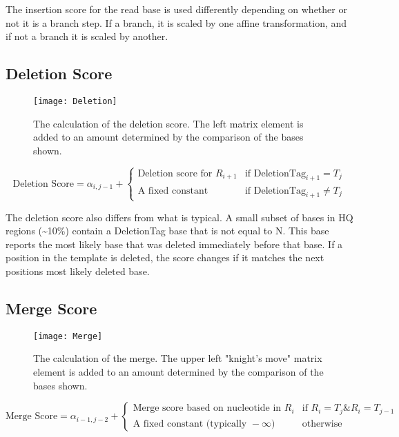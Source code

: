 \documentclass[paper=a4, fontsize=11pt]{scrartcl}
\numberwithin{equation}{section}		%
\numberwithin{figure}{section}			%
\numberwithin{table}{section}				%
\begin{document}
The insertion score for the read base is used differently depending on whether or not it is a branch step.  If a branch, it is scaled by one affine transformation, and if not a branch it is scaled by another.




\subsection{\textbf{Deletion Score}}

\begin{figure}[H] %
	\texttt{[image: Deletion]}
		\caption{The calculation of the deletion score.  The left matrix element is added to an amount determined by the comparison of the bases shown.}				
\end{figure}

\[
	\text{Deletion Score} = \alpha_{i,j-1}  +  \begin{cases}
							 \text{Deletion score  for } R_{i+1}  & \text{if }  \text{DeletionTag}_{i+1} = T_{j} \\
							 \text{A fixed constant} & \text{if }  \text{DeletionTag}_{i+1} \neq T_{j} 
							 \end{cases}
\]

The deletion score also differs from what is typical.  A small subset of bases in HQ regions (\textasciitilde10\%) contain a DeletionTag base that is not equal to N.  This base reports the most likely base that was deleted immediately before that base.  If a position in the template is deleted, the score changes if it matches the next positions most likely deleted base.




\subsection{\textbf{Merge Score}}
\begin{figure}[H] %
	\texttt{[image: Merge]}
		\caption{The calculation of the merge.  The upper left "knight's move" matrix element is added to an amount determined by the comparison of the bases shown.}				
\end{figure}

\[
	\text{Merge Score} = \alpha_{i-1,j-2}  +  \begin{cases}
							 \text{Merge score based on nucleotide in } R_{i}  & \text{if }  R_{i} = T_{j} \text{\& } R_{i} = T_{j-1} \\
							 \text{A fixed constant (typically }-\infty\text{)} & \text{otherwise}
							 \end{cases}
\]
\end{document}
